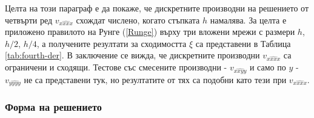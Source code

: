 \documentclass[a4paper]{article}
\newcommand{\rf}[1]{(\ref{#1})}
\theoremstyle{remark}
\begin{document}
\begin{large}
\begin{center}
\begin{table}[ht]
\label{tab:fourth-der}
\end{table}
\end{center}
\FloatBarrier
Целта на този параграф е да покаже, че дискретните производни на решението от четвърти ред $v_{\widehat{xxxx}}$ схождат числено, когато стъпката $h$ намалява. За целта е приложено правилото на Рунге \rf{Runge} върху три вложени мрежи с размери $h$, $h/2$, $h/4$, а получените резултати за сходимостта $\xi$ са представени в Таблица \ref{tab:fourth-der}. В заключение се вижда, че дискретните производни $v_{\widehat{xxxx}}$ са ограничени и сходящи. Тестове със смесените производни - $v_{\widehat{xxyy}}$ и само по $y$ - $v_{\widehat{yyyy}}$ не са представени тук, но резултатите от тях са подобни като тези при $v_{\widehat{xxxx}}$.

\subsubsection{Форма на решението}


\end{large}
\end{document}
